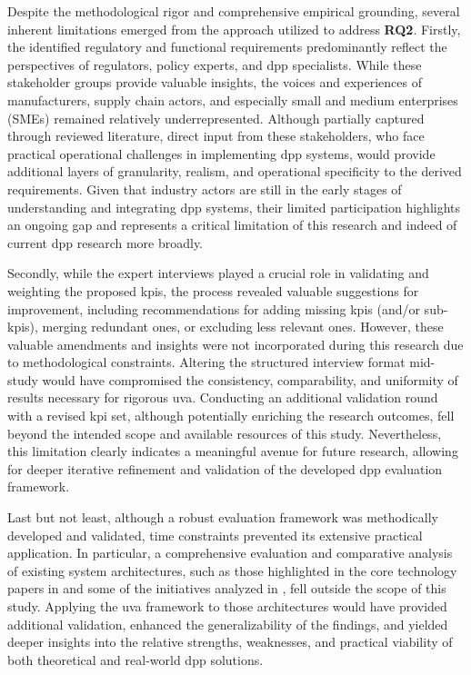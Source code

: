 Despite the methodological rigor and comprehensive empirical grounding, several inherent limitations emerged from the approach utilized to address \textbf{RQ2}. Firstly, the identified regulatory and functional requirements predominantly reflect the perspectives of regulators, policy experts, and \ac{dpp} specialists. While these stakeholder groups provide valuable insights, the voices and experiences of manufacturers, supply chain actors, and especially small and medium enterprises (SMEs) remained relatively underrepresented. Although partially captured through reviewed literature, direct input from these stakeholders, who face practical operational challenges in implementing \ac{dpp} systems, would provide additional layers of granularity, realism, and operational specificity to the derived requirements. Given that industry actors are still in the early stages of understanding and integrating \ac{dpp} systems, their limited participation highlights an ongoing gap and represents a critical limitation of this research and indeed of current \ac{dpp} research more broadly.

Secondly, while the expert interviews played a crucial role in validating and weighting the proposed \ac{kpi}s, the process revealed valuable suggestions for improvement, including recommendations for adding missing \ac{kpi}s (and/or sub-\ac{kpi}s), merging redundant ones, or excluding less relevant ones. However, these valuable amendments and insights were not incorporated during this research due to methodological constraints. Altering the structured interview format mid-study would have compromised the consistency, comparability, and uniformity of results necessary for rigorous \ac{uva}. Conducting an additional validation round with a revised \ac{kpi} set, although potentially enriching the research outcomes, fell beyond the intended scope and available resources of this study. Nevertheless, this limitation clearly indicates a meaningful avenue for future research, allowing for deeper iterative refinement and validation of the developed \ac{dpp} evaluation framework.

Last but not least, although a robust evaluation framework was methodically developed and validated, time constraints prevented its extensive practical application. In particular, a comprehensive evaluation and comparative analysis of existing system architectures, such as those highlighted in the core technology papers in  and some of the initiatives analyzed in , fell outside the scope of this study. Applying the \ac{uva} framework to those architectures would have provided additional validation, enhanced the generalizability of the findings, and yielded deeper insights into the relative strengths, weaknesses, and practical viability of both theoretical and real-world \ac{dpp} solutions. 

